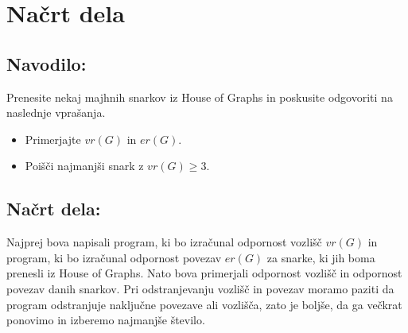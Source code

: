 \documentclass[a4paper, 10pt]{article}
\begin{document}
\section{Načrt dela}

\subsection*{Navodilo:}
Prenesite nekaj majhnih snarkov iz House of Graphs in
poskusite odgovoriti na naslednje vprašanja.
\begin{itemize}
    \item Primerjajte $vr(G)$ in $er(G)$.
    \item Poišči najmanjši snark z $vr(G) \ge 3$.
\end{itemize}

\subsection*{Načrt dela:}
Najprej bova napisali program, ki bo izračunal odpornost vozlišč $vr(G)$ in program, ki bo 
izračunal odpornost povezav $er(G)$ za snarke, ki jih boma prenesli iz House of Graphs.
Nato bova primerjali odpornost vozlišč in odpornost povezav danih snarkov. Pri odstranjevanju
vozlišč in povezav moramo paziti da program odstranjuje naključne povezave ali vozlišča, zato 
je boljše, da ga večkrat ponovimo in izberemo najmanjše število.
\end{document}
